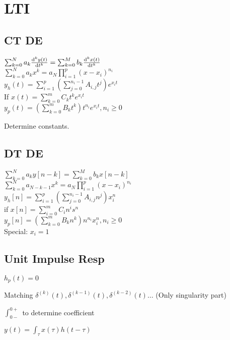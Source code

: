 \section{LTI}
\subsection*{CT DE}
$\sum_{k=0}^{N}a_k\frac{\mathrm{d}^k y(t)}{\mathrm{d} t^k}=\sum_{k=0}^{M} b_k\frac{\mathrm{d}^k x(t)}{\mathrm{d} t^k}$\\
$\sum_{k=0}^{N} a_k x^k = a_N \prod_{i=1}^p (x-x_i)^{n_i}$\\
$y_h(t) = \sum_{i=1}^{p} (\sum_{j=0}^{n_i-1} A_{i,j} t^j) e^{x_it}$\\
If $x(t)=\sum_{k=0}^{m} C_kt^ke^{x_i t}$\\
$y_p(t)=(\sum_{k=0}^{m} B_kt^k)t^{n_i} e^{x_it}, n_i\ge 0$

Determine constants.
\subsection*{DT DE}
$\sum_{k=0}^{N} a_k y[n-k] = \sum_{k=0}^{M} b_k x[n-k]$\\ 
$\sum_{k=0}^N a_{N-k-1} x^k = a_N\prod_{i=1}^p (x-x_i)^{n_i}$\\
$y_h[n] = \sum_{i=1}^{p} (\sum_{j=0}^{n_i-1} A_{i,j} n^j) x_i^{n}$\\
if $x[n] = \sum_{i=0}^m C_i n^i s^n$\\
$y_p[n]=(\sum_{k=0}^{m} B_kn^k)n^{n_i}x_i^n , n_i\ge 0$\\
Special: $x_i=1$
\subsection*{Unit Impulse Resp}

$h_p(t) = 0$

Matching $\delta^{(k)}(t), \delta^{(k-1)}(t), \delta^{(k-2)}(t)
\ldots$ (Only singularity part)

$\int_{0-}^{0+}$ to determine coefficient

$y(t)=\int_{\tau} x(\tau)  h(t-\tau)$
